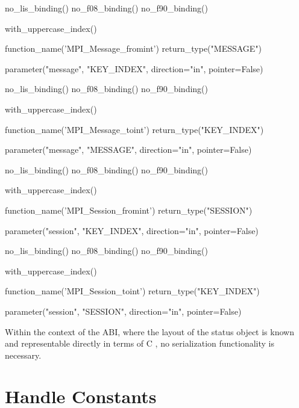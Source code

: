 %
\begin{mpi-binding}
    no_lis_binding()
    no_f08_binding()
    no_f90_binding()

    with_uppercase_index()

    function_name('MPI_Message_fromint')
    return_type("MESSAGE")

    parameter("message", "KEY_INDEX", direction="in", pointer=False)
\end{mpi-binding}

%
\begin{mpi-binding}
    no_lis_binding()
    no_f08_binding()
    no_f90_binding()

    with_uppercase_index()

    function_name('MPI_Message_toint')
    return_type("KEY_INDEX")

    parameter("message", "MESSAGE", direction="in", pointer=False)
\end{mpi-binding}

%
\begin{mpi-binding}
    no_lis_binding()
    no_f08_binding()
    no_f90_binding()

    with_uppercase_index()

    function_name('MPI_Session_fromint')
    return_type("SESSION")

    parameter("session", "KEY_INDEX", direction="in", pointer=False)
\end{mpi-binding}

\bindingislistfalse
{}%
\begin{mpi-binding}
    no_lis_binding()
    no_f08_binding()
    no_f90_binding()

    with_uppercase_index()

    function_name('MPI_Session_toint')
    return_type("KEY_INDEX")

    parameter("session", "SESSION", direction="in", pointer=False)
\end{mpi-binding}

Within the context of the ABI, where the layout of the status object
is known and representable directly in terms of C ,
no serialization functionality is necessary.

\section{Handle Constants}
\label{sec:handle-abi}

